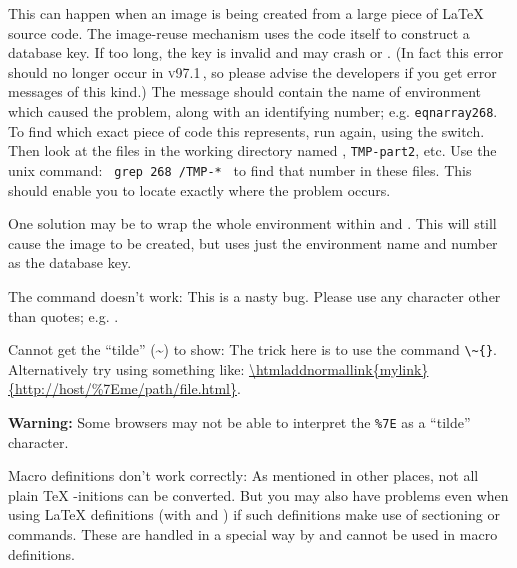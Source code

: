 \begin{htmllist}
\begin{changebar}
This can happen when an image is being created from a large piece
of \LaTeX{} source code. The image-reuse mechanism uses the code itself
to construct a database key. If too long, the key is invalid and may
crash  or . (In fact this error should no longer
occur in \textsc{v97.1}\,, so please advise the \latextohtml{} developers if
you get error messages of this kind.)\html{\\}
The message should contain the name of environment which caused the problem,
along with an identifying number; e.g. \texttt{eqnarray268}.
To find which exact piece of code this represents, run \latextohtml{}
again, using the  switch. Then look at the files
in the working directory named , \texttt{TMP-part2}, etc.
Use the unix  command: \texttt{ grep 268 }\texttt{/TMP-* }
to find that number in these files.
This should enable you to locate exactly where the problem occurs.

One solution may be to wrap the whole environment within
 and .
This will still cause the image to be created,
but uses just the environment name and number as the database key.
\end{changebar}%



\item [The \Lc{verb"ABC"} command doesn't work: ]
This is a nasty bug. Please use any character other than quotes;
e.g. .

\item [Cannot get the ``tilde'' (\~{}) to show: \hfill]
The trick here is to use the command \verb|\~{}|.\html{\\}
Alternatively try using something like:
\url{\htmladdnormallink{mylink}{http://host/\%7Eme/path/file.html}}.

\textbf{Warning:} Some browsers may not be able to interpret the \verb|%7E|
as a ``tilde'' character.

\item [Macro definitions don't work correctly: ]
As mentioned in other places, not all plain \TeX{} -initions
can be converted.
But you may also have problems even when using \LaTeX{} definitions
(with  and ) if such definitions
make use of sectioning or  commands. These are
handled in a special way by \latextohtml{} and cannot be used in
macro definitions.


\end{htmllist}
